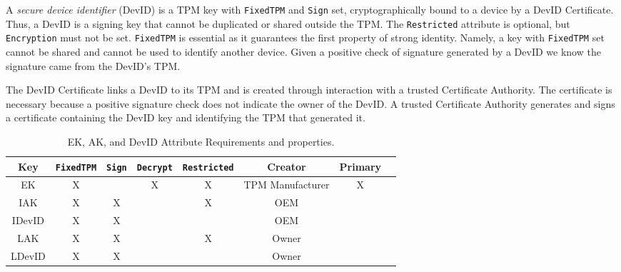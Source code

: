 \documentclass[runningheads]{llncs}
\begin{document}

A \emph{secure device identifier} (DevID) is a TPM key with
\verb|FixedTPM| and \verb|Sign| set, cryptographically bound to a
device by a DevID Certificate.  Thus, a DevID is a signing key that
cannot be duplicated or shared outside the TPM.  The \verb|Restricted|
attribute is optional, but \verb|Encryption| must not be set.
\verb|FixedTPM| is essential as it guarantees the first property of
strong identity.  Namely, a key with \verb|FixedTPM| set cannot be
shared and cannot be used to identify another device.  Given a
positive check of signature generated by a DevID we know the signature
came from the DevID's TPM.

The DevID Certificate links a DevID to its TPM and is created through
interaction with a trusted Certificate Authority.  The certificate is
necessary because a positive signature check does not indicate the
owner of the DevID.  A trusted Certificate Authority generates and
signs a certificate containing the DevID key and identifying the TPM
that generated it.

\begin{table}[hbtp]
  \begin{center}
    \footnotesize
    \begin{tabular}{ |c|c|c|c|c|c|c|c| }
      \hline
Key & \verb|FixedTPM| & \verb|Sign| & \verb|Decrypt| & \verb|Restricted| &
Creator & Primary \\
      \hline
      \hline
      EK & X &   & X & X & TPM Manufacturer & X \\
      \hline
      IAK & X & X &   & X & OEM &  \\
      \hline
      IDevID & X & X &   &   & OEM &  \\
      \hline
      LAK & X & X &   & X & Owner & \\
      \hline
      LDevID & X & X &   &   & Owner & \\
      \hline
    \end{tabular}
    \caption{EK, AK, and DevID Attribute Requirements and properties.}
    \label{fig:req_and_recs}
  \end{center}
\end{table}
\end{document}
